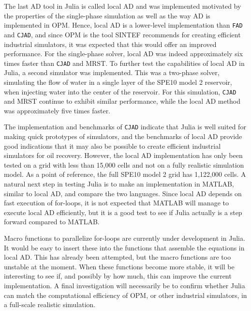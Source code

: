 The last AD tool in Julia is called local AD and was implemented motivated by the properties of the single-phase simulation as well as the way AD is implemented in OPM. Hence, local AD is a lower-level implementation than \texttt{FAD} and \texttt{CJAD}, and since OPM is the tool SINTEF recommends for creating efficient industrial simulators, it was expected that this would offer an improved performance. For the single-phase solver, local AD was indeed approximately six times faster than \texttt{CJAD} and MRST. To further test the capabilities of local AD in Julia, a second simulator was implemented. This was a two-phase solver, simulating the flow of water in a single layer of the SPE10 model 2 reservoir, when injecting water into the center of the reservoir. For this simulation, \texttt{CJAD} and MRST continue to exhibit similar performance, while the local AD method was approximately five times faster.

The implementation and benchmarks of \texttt{CJAD} indicate that Julia is well suited for making quick prototypes of simulators, and the benchmarks of local AD provide good indications that it may also be possible to create efficient industrial simulators for oil recovery. However, the local AD implementation has only been tested on a grid with less than 15,000 cells and not on a fully realistic simulation model. As a point of reference, the full SPE10 model 2 grid has 1,122,000 cells. A natural next step in testing Julia is to make an implementation in MATLAB, similar to local AD, and compare the two languages. Since local AD depends on fast execution of for-loops, it is not expected that MATLAB will manage to execute local AD efficiently, but it is a good test to see if Julia actually is a step forward compared to MATLAB. 

Macro functions to parallelize for-loops are currently under development in Julia. It would be easy to insert these into the functions that assemble the equations in local AD. This has already been attempted, but the macro functions are too unstable at the moment. When these functions become more stable, it will be interesting to see if, and possibly by how much, this can improve the current implementation. A final investigation will necessarily be to confirm whether Julia can match the computational efficiency of OPM, or other industrial simulators, in a full-scale realistic simulation. 

